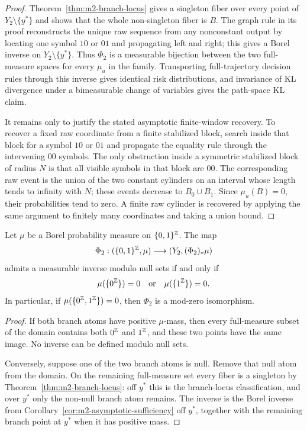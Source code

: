 \begin{proof}
Theorem~\ref{thm:m2-branch-locus} gives a singleton fiber over every point of
$Y_2\setminus\{y^\ast\}$ and shows that the whole non-singleton fiber is $B$.
The graph rule in its proof reconstructs the unique raw sequence from any
nonconstant output by locating one symbol $10$ or $01$ and propagating left and
right; this gives a Borel inverse on $Y_2\setminus\{y^\ast\}$.  Thus $\Phi_2$
is a measurable bijection between the two full-measure spaces for every
$\mu_u$ in the family.  Transporting full-trajectory decision rules through
this inverse gives identical risk distributions, and invariance of KL
divergence under a bimeasurable change of variables gives the path-space KL
claim.

It remains only to justify the stated asymptotic finite-window recovery.  To
recover a fixed raw coordinate from a finite stabilized block, search inside
that block for a symbol $10$ or $01$ and propagate the equality rule through
the intervening $00$ symbols.  The only obstruction inside a symmetric
stabilized block of radius $N$ is that all visible symbols in that block are
$00$.  The corresponding raw event is the union of the two constant cylinders
on an interval whose length tends to infinity with $N$; these events decrease
to $B_0\cup B_1$.  Since $\mu_u(B)=0$, their probabilities tend to zero.  A
finite raw cylinder is recovered by applying the same argument to finitely
many coordinates and taking a union bound.
\end{proof}

\begin{corollary}\label{cor:m2-mod-zero}
Let $\mu$ be a Borel probability measure on $\{0,1\}^{\mathbb{Z}}$.  The map
\[
\Phi_2:(\{0,1\}^{\mathbb{Z}},\mu)\longrightarrow(Y_2,(\Phi_2)_*\mu)
\]
admits a measurable inverse modulo null sets if and only if
\[
\mu(\{0^{\mathbb{Z}}\})=0\quad\text{or}\quad \mu(\{1^{\mathbb{Z}}\})=0.
\]
In particular, if $\mu(\{0^{\mathbb{Z}},1^{\mathbb{Z}}\})=0$, then $\Phi_2$ is a mod-zero
isomorphism.
\end{corollary}

\begin{proof}
If both branch atoms have positive $\mu$-mass, then every full-measure subset
of the domain contains both $0^{\mathbb{Z}}$ and $1^{\mathbb{Z}}$, and these two points have
the same image.  No inverse can be defined modulo null sets.

Conversely, suppose one of the two branch atoms is null.  Remove that null
atom from the domain.  On the remaining full-measure set every fiber is a
singleton by Theorem~\ref{thm:m2-branch-locus}: off $y^\ast$ this is the
branch-locus classification, and over $y^\ast$ only the non-null branch atom
remains.  The inverse is the Borel inverse from
Corollary~\ref{cor:m2-asymptotic-sufficiency} off $y^\ast$, together with the
remaining branch point at $y^\ast$ when it has positive mass.
\end{proof}

